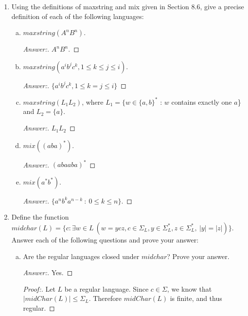\documentclass[10pt]{article}
\newcommand{\card}[1]{\left| #1 \right|}
\begin{document}
\begin{enumerate}[1)]

\item
Using the definitions of  maxstring and  mix given in Section  8.6, give a precise definition of each of the 
following languages:

\begin{enumerate}[a)]
\item
$maxstring(A^nB^n)$.
\begin{proof}[Answer:]
$A^nB^n$.
\end{proof}

\item
$maxstring(a^ib^jc^k, 1 \leq k \leq j \leq i)$.
\begin{proof}[Answer:]
$\{a^ib^jc^k, 1 \leq k = j \leq i\}$
\end{proof}

\item
$maxstring(L_1L_2)$, where $L_1 = \{w \in \{a, b\}^*$ : $w$ contains exactly one $a$\} and $L_2 = \{a\}$.
\begin{proof}[Answer:]
$L_1L_2$
\end{proof}

\item
$mix((aba)^*)$.
\begin{proof}[Answer:]
$(abaaba)^*$
\end{proof}

\item
$mix(a^*b^*)$.
\begin{proof}[Answer:]
$\{a^nb^ka^{n-k}\ :\ 0 \leq k \leq n\}$.
\end{proof}
\end{enumerate}


\item
Define the function $midchar(L) = \{c : \exists w \in L\ (w = ycz, c \in \Sigma _L, y \in \Sigma _L^*, z \in \Sigma _L^*,\ \card{y} = \card{z})\}$.  Answer each of the following questions and prove your answer:

\begin{enumerate}[a)]
\item
Are the regular languages closed under $midchar$?  Prove your answer.
\begin{proof}[Answer:]
Yes.
\end{proof}
\begin{proof}[Proof:]
Let $L$ be a regular language.  Since $c \in \Sigma$, we know that $\card{midChar(L)} \leq \Sigma _L$.  Therefore $midChar(L)$ is finite, and thus regular.
\end{proof}


\end{enumerate}
\end{enumerate}
\end{document}
